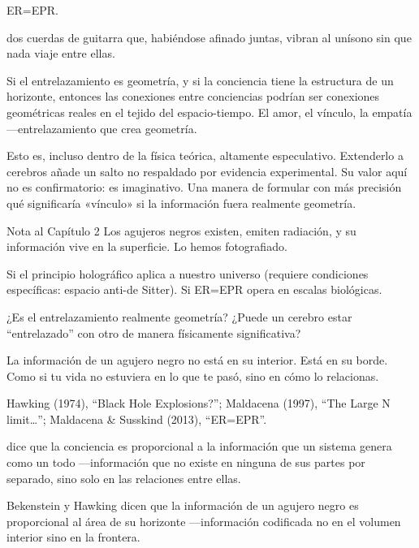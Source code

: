 \begin{fisica}
 ER=EPR.

 dos cuerdas de guitarra que, habiéndose afinado juntas, vibran al unísono sin que nada viaje entre ellas.
\end{fisica}
Si el entrelazamiento es geometría, y si la conciencia tiene la estructura de un horizonte, entonces las conexiones entre conciencias podrían ser conexiones geométricas reales en el tejido del espacio-tiempo. El amor, el vínculo, la empatía —entrelazamiento que crea geometría.

Esto es, incluso dentro de la física teórica, altamente especulativo. Extenderlo a cerebros añade un salto no respaldado por evidencia experimental. Su valor aquí no es confirmatorio: es imaginativo. Una manera de formular con más precisión qué significaría «vínculo» si la información fuera realmente geometría.

\begin{notacap}{Nota al Capítulo 2}
 Los agujeros negros existen, emiten radiación, y su información vive en la superficie. Lo hemos fotografiado.

 Si el principio holográfico aplica a nuestro universo (requiere condiciones específicas: espacio anti-de Sitter). Si ER=EPR opera en escalas biológicas.

 ¿Es el entrelazamiento realmente geometría? ¿Puede un cerebro estar “entrelazado” con otro de manera físicamente significativa?

 La información de un agujero negro no está en su interior. Está en su borde. Como si tu vida no estuviera en lo que te pasó, sino en cómo lo relacionas.

 Hawking (1974), “Black Hole Explosions?”; Maldacena (1997), “The Large N limit…”; Maldacena \& Susskind (2013), “ER=EPR”.
\end{notacap}
\noindent {} dice que la conciencia es proporcional a la información que un sistema genera como un todo —información que no existe en ninguna de sus partes por separado, sino solo en las relaciones entre ellas.

Bekenstein y Hawking dicen que la información de un agujero negro es proporcional al área de su horizonte —información codificada no en el volumen interior sino en la frontera.

